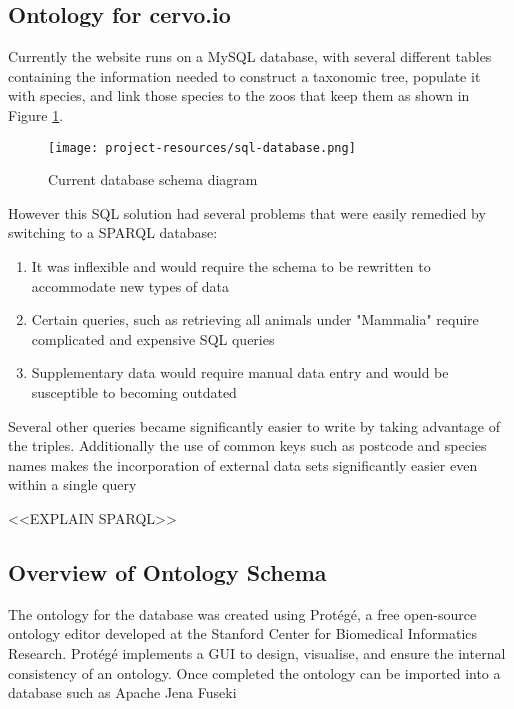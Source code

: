 \documentclass[a4paper]{article}
\begin{document}
\subsection{Ontology for cervo.io}
Currently the website runs on a MySQL database, with several different tables containing the information needed to construct a taxonomic tree, populate it with species, and link those species to the zoos that keep them as shown in Figure \ref{ref:cervoSQL}. 
\begin{figure}[H]
\centering
\texttt{[image: project-resources/sql-database.png]}
\caption{Current database schema diagram}
\label{ref:cervoSQL}
\end{figure}


However this SQL solution had several problems that were easily remedied by switching to a SPARQL database:
\begin{enumerate}
\item It was inflexible and would require the schema to be rewritten to accommodate new types of data
\item Certain queries, such as retrieving all animals under "Mammalia" require complicated and expensive SQL queries
\item Supplementary data would require manual data entry and would be susceptible to becoming outdated
\end{enumerate} 


Several other queries became significantly easier to write by taking advantage of the triples. Additionally the use of common keys such as postcode and species names makes the incorporation of external data sets significantly easier even within a single query


<<EXPLAIN SPARQL>>

\subsection{Overview of Ontology Schema}
The ontology for the database was created using Protégé, a free open-source ontology editor developed at the Stanford Center for Biomedical Informatics Research\autocite{Musen2015}. Protégé implements a GUI to design, visualise, and ensure the internal consistency of an ontology. Once completed the ontology can be imported into a database such as Apache Jena Fuseki
\end{document}

